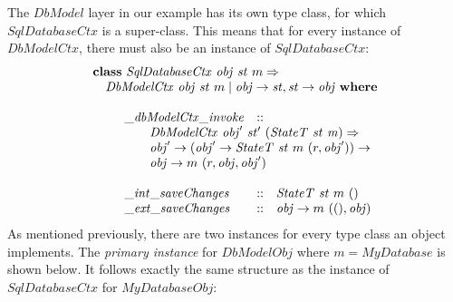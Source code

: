 The $\mathit{DbModel}$ layer in our example has its own type class, for which $\mathit{SqlDatabaseCtx}$ is a super-class. This means that for every instance of $\mathit{DbModelCtx}$, there must also be an instance of $\mathit{SqlDatabaseCtx}$:
\begin{displaymath}
\begin{array}{l}
\mathbf{class}~\mathit{SqlDatabaseCtx}~\mathit{obj}~\mathit{st}~m \Rightarrow \\
\quad \mathit{DbModelCtx}~\mathit{obj}~\mathit{st}~m \mid \mathit{obj} \to \mathit{st}, \mathit{st} \to \mathit{obj}~\mathbf{where}\\\\
\qquad \begin{array}{lcl}
\mathit{\_\mathit{dbModelCtx\_invoke}} & :: & \\
\multicolumn{3}{l}{\qquad \mathit{DbModelCtx}~\mathit{obj}'~\mathit{st}'~(\mathit{StateT}~\mathit{st}~\mathit{m}) \Rightarrow}\\
\multicolumn{3}{l}{\qquad \mathit{obj}' \to (\mathit{obj}' \to \mathit{StateT}~\mathit{st}~m~(r,\mathit{obj}')) \to} \\
\multicolumn{3}{l}{\qquad \mathit{obj} \to m~(r,\mathit{obj},\mathit{obj}')} \\\\
\mathit{\_int\_saveChanges} & :: & \mathit{StateT}~\mathit{st}~m~\mathit{()} \\
\mathit{\_ext\_saveChanges} & :: & \mathit{obj} \to m~(\mathit{()}, \mathit{obj})
\end{array}
\end{array}
\end{displaymath}
As mentioned previously, there are two instances for every type class an object implements. The \emph{primary instance} for $\mathit{DbModelObj}$ where $m = \mathit{MyDatabase}$ is shown below. It follows exactly the same structure as the instance of $\mathit{SqlDatabaseCtx}$ for $\mathit{MyDatabaseObj}$:
